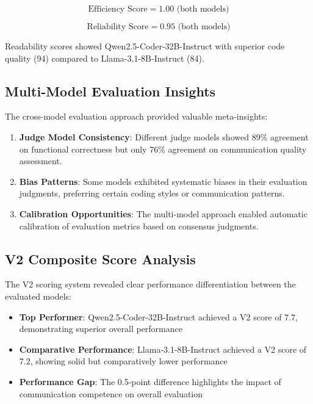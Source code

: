 \documentclass[conference]{IEEEtran}
\begin{document}
\begin{equation}
\text{Efficiency Score} = 1.00 \text{ (both models)}
\end{equation}

\begin{equation}
\text{Reliability Score} = 0.95 \text{ (both models)}
\end{equation}

Readability scores showed Qwen2.5-Coder-32B-Instruct with superior code quality (94) compared to Llama-3.1-8B-Instruct (84).

\subsection{Multi-Model Evaluation Insights}

The cross-model evaluation approach provided valuable meta-insights:

\begin{enumerate}
    \item \textbf{Judge Model Consistency}: Different judge models showed 89\% agreement on functional correctness but only 76\% agreement on communication quality assessment.
    \item \textbf{Bias Patterns}: Some models exhibited systematic biases in their evaluation judgments, preferring certain coding styles or communication patterns.
    \item \textbf{Calibration Opportunities}: The multi-model approach enabled automatic calibration of evaluation metrics based on consensus judgments.
\end{enumerate}

\subsection{V2 Composite Score Analysis}

The V2 scoring system revealed clear performance differentiation between the evaluated models:

\begin{itemize}
    \item \textbf{Top Performer}: Qwen2.5-Coder-32B-Instruct achieved a V2 score of 7.7, demonstrating superior overall performance
    \item \textbf{Comparative Performance}: Llama-3.1-8B-Instruct achieved a V2 score of 7.2, showing solid but comparatively lower performance
    \item \textbf{Performance Gap}: The 0.5-point difference highlights the impact of communication competence on overall evaluation
\end{itemize}
\end{document}
